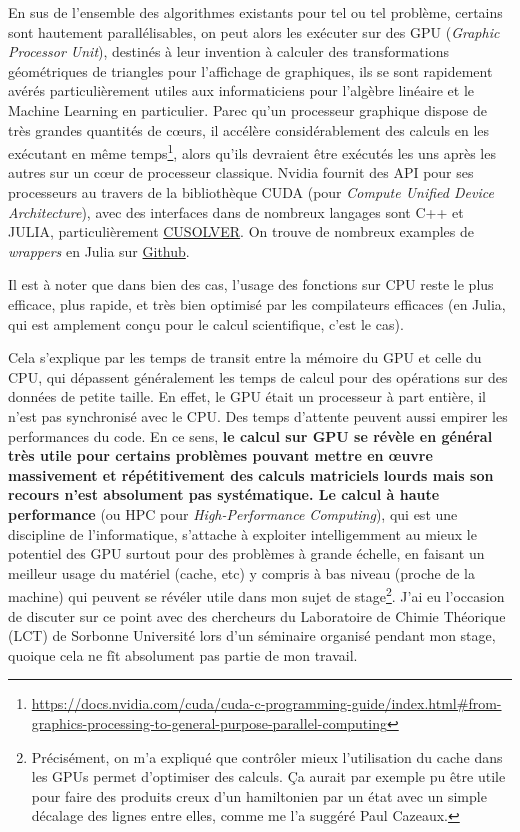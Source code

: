 \documentclass[svgnames,dvipsnames,a4paper,10pt,french]{report}
\begin{document}
En sus de l'ensemble des algorithmes existants pour tel ou tel problème, certains sont hautement parallélisables, on peut alors les exécuter sur des GPU (\textit{Graphic Processor Unit}), destinés à leur invention à calculer des transformations géométriques de triangles pour l'affichage de graphiques, ils se sont rapidement avérés particulièrement utiles aux informaticiens pour l'algèbre linéaire et le Machine Learning en particulier. Parec qu'un processeur graphique dispose de très grandes quantités de c\oe{}urs, il accélère considérablement des calculs en les exécutant en même temps\footnote{\url{https://docs.nvidia.com/cuda/cuda-c-programming-guide/index.html#from-graphics-processing-to-general-purpose-parallel-computing}}, alors qu'ils devraient être exécutés les uns après les autres sur un c\oe{}ur de processeur classique. Nvidia fournit des API pour ses processeurs au travers de la bibliothèque CUDA (pour \textit{Compute Unified Device Architecture}), avec des interfaces dans de nombreux langages sont C++ et JULIA, particulièrement \href{https://docs.nvidia.com/cuda/cusolver/index.html}{CUSOLVER}. On trouve de nombreux examples de \emph{wrappers} en Julia sur \href{https://github.com/JuliaGPU/CUDA.jl}{Github}.



Il est à noter que dans bien des cas, l'usage des fonctions sur CPU reste le plus efficace, plus rapide, et très bien optimisé par les compilateurs efficaces (en Julia, qui est amplement conçu pour le calcul scientifique, c'est le cas).

Cela s'explique par les temps de transit entre la mémoire du GPU et celle du CPU, qui dépassent généralement les temps de calcul pour des opérations sur des données de petite taille. En effet, le GPU était un processeur à part entière, il n'est pas synchronisé avec le CPU. Des temps d'attente peuvent aussi empirer les performances du code. En ce sens, \textbf{le calcul sur GPU se révèle en général très utile pour certains problèmes pouvant mettre en \oe{}uvre massivement et répétitivement des calculs matriciels lourds mais son recours n'est absolument pas systématique. Le calcul à haute performance} (ou HPC pour \textit{High-Performance Computing}), qui est une discipline de l'informatique, s'attache à exploiter intelligemment au mieux le potentiel des GPU surtout pour des problèmes à grande échelle, en faisant un meilleur usage du matériel (cache, etc) y compris à bas niveau (proche de la machine) qui peuvent se révéler utile dans mon sujet de stage\footnote{Précisément, on m'a expliqué que contrôler mieux l'utilisation du cache dans les GPUs permet d'optimiser des calculs. Ça aurait par exemple pu être utile pour faire des produits creux d'un hamiltonien par un état avec un simple décalage des lignes entre elles, comme me l'a suggéré Paul Cazeaux.}. J'ai eu l'occasion de discuter sur ce point avec des chercheurs du Laboratoire de Chimie Théorique (LCT) de Sorbonne Université lors d'un séminaire organisé pendant mon stage, quoique cela ne fît absolument pas partie de mon travail.
\end{document}
